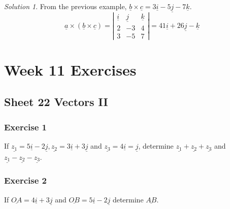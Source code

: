 \documentclass[
  english,
  11pt,
  oneside]{book}
\newcommand{\slide}{}
\theoremstyle{definition}
\theoremstyle{definition}
\theoremstyle{definition}
\theoremstyle{definition}
\theoremstyle{remark}
\newtheorem*{solution}{Solution}
\begin{document}
\begin{solution}
From the previous example, \(\underline b \times\underline c = 3\underline i-5\underline j-7\underline k\).
\[\underline a \times (\underline b \times\underline c) = \left|\begin{array}{ccc}\underline i&\underline j&\underline k\\2&-3&4\\3&-5&7\end{array}\right| = 41\underline i+26\underline j-\underline k\]
\end{solution}

\begin{slidesonly}

\slide

\hbox{}
\slide

\end{slidesonly}

\chapter*{Week 11 Exercises}\label{week-11-exercises}

\section{Sheet 22 Vectors II}\label{sheet-22-vectors-ii}

\subsection*{Exercise 1}\label{exercise-1-13}

If \(\underline{z_1} = 5\underline{i}-2\underline{j}, \underline{z_2} = 3\underline{i}+3\underline{j}\) and \(\underline{z_3}=4\underline{i}=\underline{j}\), determine \(\underline{z_1}+\underline{z_2}+\underline{z_3}\) and \(\underline{z_1}-\underline{z_2}-\underline{z_3}\).

\slide

\subsection*{Exercise 2}\label{exercise-2-13}

If \(\underline{OA}=4\underline{i}+3\underline{j}\) and \(\underline{OB}=5\underline{i}-2\underline{j}\) determine \(\underline{AB}\).
\end{document}
